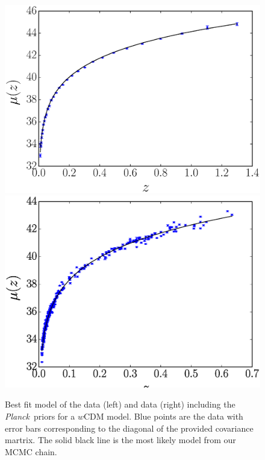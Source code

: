 \documentclass[12pt,a4paper]{article}
\newcommand\Planck{{\it Planck}\ }
\begin{document}
\begin{figure}
  \centering
  \includegraphics[width=0.5\linewidth]{figures/betoule_wcdm_withprior_bestfit.eps}
  \includegraphics[width=0.5\linewidth]{figures/rest_wcdm_withprior_bestfit.eps}
  \caption{Best fit model of the \citet{betoule2014} data (left) and \citet{rest2014} data (right) including the
    \Planck priors for a $w$CDM model. Blue points are the data with
    error bars corresponding to the diagonal of the provided covariance martrix.
    The solid black line is the most likely model from our MCMC chain.}
  \label{fig:betoule_wcdm_prior_bestfit}
\end{figure}
%
\end{document}

